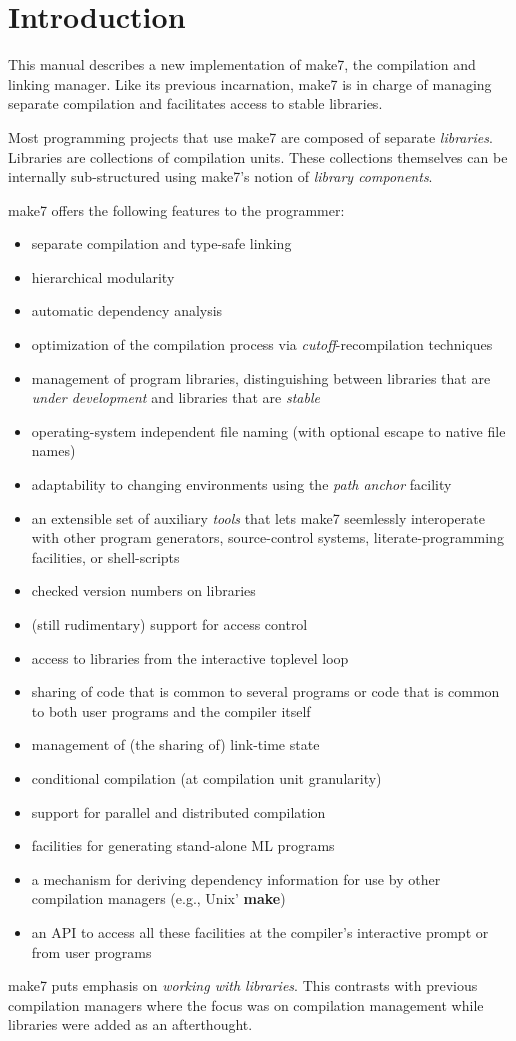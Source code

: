 
\section{Introduction}

This manual describes a new implementation of make7, the
compilation and linking manager.  Like
its previous incarnation, make7 is in charge of managing separate
compilation and facilitates access to stable libraries.

Most programming projects that use make7 are composed of separate {\em
libraries}.  Libraries are collections of compilation units.  These
collections themselves can be internally sub-structured using make7's
notion of {\em library components}.

make7 offers the following features to the programmer:

\begin{itemize}
\item separate compilation and type-safe linking~\cite{appel94:sepcomp}
\item hierarchical modularity~\cite{blume:appel:cm99}
\item automatic dependency analysis~\cite{blume:depend99}
\item optimization of the compilation process via {\em
cutoff}-recompilation techniques~\cite{tichy94}
\item management of program libraries, distinguishing between libraries
that are {\em under development} and libraries that are {\em stable}
\item operating-system independent file naming (with optional escape
to native file names)
\item adaptability to changing environments using the {\em path anchor}
facility
\item an extensible set of auxiliary {\em tools} that lets make7
seemlessly interoperate with other program generators, source-control
systems, literate-programming facilities, or shell-scripts
\item checked version numbers on libraries
\item (still rudimentary) support for access control
\item access to libraries from the interactive toplevel loop
\item sharing of code that is common to several programs or code that
is common to both user programs and the compiler itself
\item management of (the sharing of) link-time state
\item conditional compilation (at compilation unit granularity)
\item support for parallel and distributed compilation
\item facilities for generating stand-alone ML programs
\item a mechanism for deriving dependency information for use
by other compilation managers (e.g., Unix' {\bf make})
\item an API to access all these facilities at the compiler's interactive
prompt or from user programs
\end{itemize}

make7 puts emphasis on {\em working with libraries}.  This contrasts with
previous compilation managers where the focus was on
compilation management while libraries were added as an afterthought.


